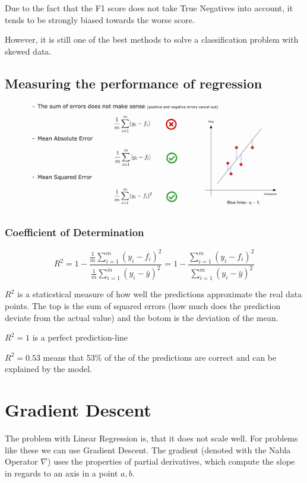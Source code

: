 \documentclass[11pt]{article}
\begin{document}
Due to the fact that the F1 score does not take True Negatives into account, it tends to be strongly biased towards the worse score.

However, it is still one of the best methods to solve a classification problem with skewed data.


\subsection{Measuring the performance of regression}

\begin{figure}[htb]
    \centering
    \includegraphics[keepaspectratio=true, width=\linewidth]{regression_error.png}
    \label{fig:regression_error}
\end{figure}

\subsubsection{Coefficient of Determination} \label{sec:r_squared}

\begin{equation}
    R^2 = 1- \frac{\frac{1}{m} \sum^{m}_{i=1}(y_{i} - f_{i})^2}{\frac{1}{m} \sum^{m}_{i=1}(y_{i} - \bar{y})^2} =1 - \frac{\sum^{m}_{i=1}(y_{i} - f_{i})^2}{\sum^{m}_{i=1}(y_{i} - \bar{y})^2}
\end{equation}

$R^2$ is a staticstical measure of how well the predictions approximate the real data points.
The top is the sum of squared errors (how much does the prediction deviate from the actual value) and the botom is the deviation of the mean.

$R^2 = 1$ is a perfect prediction-line

$R^2 = 0.53$ means that 53\% of the of the predictions are correct and can be explained by the model.

\newpage

\section{Gradient Descent}
The problem with Linear Regression is, that it does not scale well. For problems like these we can use Gradient Descent. The gradient (denoted with the Nabla Operator $\nabla$) uses the properties of partial derivatives, which compute the slope in regards to an axis in a point $a,b$.
\end{document}
